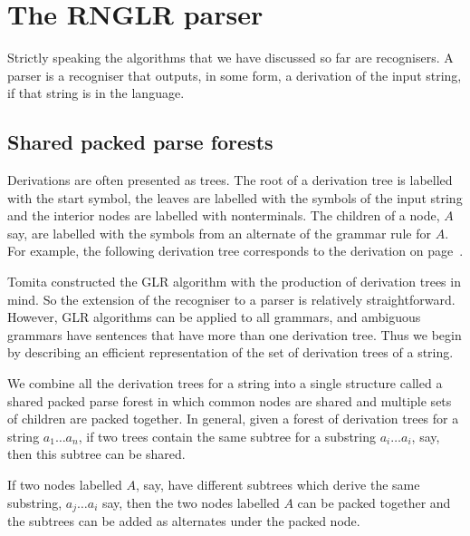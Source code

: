\section{The RNGLR parser}

Strictly speaking the algorithms that we have discussed so far are
recognisers. A parser is a recogniser that outputs, in some form, a
derivation of the input string, if that string is in the language.

\subsection{Shared packed parse forests}
Derivations are often presented as trees. The root of a derivation
tree is labelled with the start symbol, the leaves are labelled with
the symbols of the input string and the interior nodes are labelled
with nonterminals. The children of a node, $A$ say, are labelled with the
symbols from an alternate of the grammar rule for $A$.
For example, the following derivation tree corresponds to the
derivation on page~\pageref{p_derive}.
\begin{center}
\footnotesize

\end{center}

Tomita constructed the GLR algorithm with the production of derivation
trees in mind. So the extension of the recogniser to a parser is
relatively straightforward. However, GLR algorithms can be applied to
all grammars, and ambiguous grammars have sentences that have more
than one derivation tree. Thus we begin by describing an efficient 
representation of the set of derivation trees of a string.

We combine all the derivation trees for a string into a single structure
called a shared packed parse forest in which common nodes are
shared and multiple sets of children are packed together.
In general, given a forest of derivation trees for a string $a_1\ldots a_n$,
if two trees contain the same subtree for a substring $a_i\ldots a_i$,
say, then this subtree can be shared.
\begin{center}
\footnotesize

\end{center}

If two nodes labelled $A$, say, have different subtrees which derive
the same substring, $a_j\ldots a_i$ say, then the two nodes labelled $A$
can be packed together and the subtrees can be added as alternates
under the packed node.
\begin{center}
\footnotesize

\end{center}

